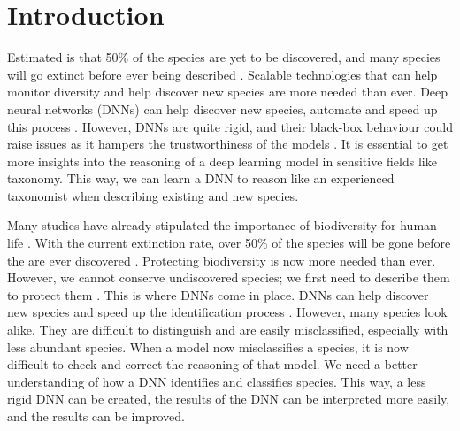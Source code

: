 \documentclass[a4paper, 12pt, oneside]{book} %
\begin{document}
\renewcommand{\thesection}{\arabic{section}}
\section{Introduction}

Estimated is that 50\% of the species are yet to be discovered, and many species will go extinct before ever being described \autocite{lees_species_2015}.
Scalable technologies that can help monitor diversity and help discover new species are more needed than ever.
Deep neural networks (DNNs) can help discover new species, automate and speed up this process \autocite{van_horn_inaturalist_2018}.
However, DNNs are quite rigid, and their black-box behaviour could raise issues as it hampers the trustworthiness of the models \autocite{carvalho_machine_2019}.
It is essential to get more insights into the reasoning of a deep learning model in sensitive fields like taxonomy.
This way, we can learn a DNN to reason like an experienced taxonomist when describing existing and new species.

Many studies have already stipulated the importance of biodiversity for human life \autocite{pimentel_economic_1997, gowdy_value_1997, raffaelli_links_2010, joppa_biodiversity_2011, pimm_how_2018}.
With the current extinction rate, over 50\% of the species will be gone before the are ever discovered \autocite{lees_species_2015}.
Protecting biodiversity is now more needed than ever.
However, we cannot conserve undiscovered species; we first need to describe them to protect them \autocite{joppa_biodiversity_2011}.
This is where DNNs come in place.
DNNs can help discover new species and speed up the identification process \autocite{van_horn_inaturalist_2018}.
However, many species look alike.
They are difficult to distinguish and are easily misclassified, especially with less abundant species.
When a model now misclassifies a species, it is now difficult to check and correct the reasoning of that model.
We need a better understanding of how a DNN identifies and classifies species. 
This way, a less rigid DNN can be created, the results of the DNN can be interpreted more easily, and the results can be improved.
\end{document}
